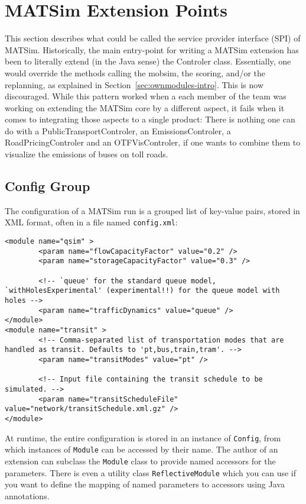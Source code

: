\section{MATSim Extension Points}
This section describes what could be called the service provider interface (SPI) of MATSim.
Historically, the main entry-point for writing a MATSim extension has been to literally extend (in the Java sense)
the Controler class.  Essentially, one would override the methods calling the mobsim, the scoring, and/or the replanning, as explained in Section~\ref{sec:ownmodules-intro}. This is now discouraged. While this pattern worked when a each member of the team
was working on extending the MATSim core by a different aspect, it fails when it comes to
integrating those aspects to a single product: There is nothing one can do with a PublicTransportControler, an EmissionsControler, a RoadPricingControler and an OTFVisControler,
if one wants to combine them to visualize the emissions of buses on toll roads.

\subsection{Config Group}
\label{sec:config}
The configuration of a MATSim run is a grouped list of key-value pairs, stored in XML
format, often in a file named \lstinline$config.xml$:
\begin{lstlisting}
<module name="qsim" >
		<param name="flowCapacityFactor" value="0.2" />
		<param name="storageCapacityFactor" value="0.3" />

		<!-- `queue' for the standard queue model, `withHolesExperimental' (experimental!!) for the queue model with holes -->
		<param name="trafficDynamics" value="queue" />
</module>
<module name="transit" >
		<!-- Comma-separated list of transportation modes that are handled as transit. Defaults to 'pt,bus,train,tram'. -->
		<param name="transitModes" value="pt" />

		<!-- Input file containing the transit schedule to be simulated. -->
		<param name="transitScheduleFile" value="network/transitSchedule.xml.gz" />
</module>
\end{lstlisting}
At runtime, the entire configuration is stored in an instance of \lstinline$Config$, from which instances of \lstinline$Module$ can be accessed by their name.
The author of an extension can subclass the \lstinline$Module$ class to provide named accessors for the parameters.
There is even a utility class \lstinline$ReflectiveModule$ which you can use if you want to define the mapping of named parameters to accessors
using Java annotations.

